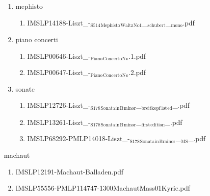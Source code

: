 \documentclass[11pt]{article}
\begin{document}
\begin{enumerate}
\item mephisto
\label{sec-1-1-1-1-44-42-7}
\begin{enumerate}
\item IMSLP14188-Liszt\_-$_{\text{S514}}$$_{\text{Mephisto}}$$_{\text{Waltz}}$$_{\text{No1}}$\_$_{\text{schubert}}$\_$_{\text{mono}}$.pdf
\label{sec-1-1-1-1-44-42-7-1}
\end{enumerate}

\item piano concerti
\label{sec-1-1-1-1-44-42-8}
\begin{enumerate}
\item IMSLP00646-Liszt\_-$_{\text{Piano}}$$_{\text{Concerto}}$$_{\text{No}}$.1.pdf
\label{sec-1-1-1-1-44-42-8-1}

\item IMSLP00647-Liszt\_-$_{\text{Piano}}$$_{\text{Concerto}}$$_{\text{No}}$.2.pdf
\label{sec-1-1-1-1-44-42-8-2}
\end{enumerate}

\item sonate
\label{sec-1-1-1-1-44-42-9}
\begin{enumerate}
\item IMSLP12726-Liszt\_-$_{\text{S178}}$$_{\text{Sonata}}$$_{\text{in}}$$_{\text{B}}$$_{\text{minor}}$\_$_{\text{breitkopf}}$$_{\text{1st}}$$_{\text{ed}}$\_.pdf
\label{sec-1-1-1-1-44-42-9-1}

\item IMSLP13261-Liszt\_-$_{\text{S178}}$$_{\text{Sonata}}$$_{\text{in}}$$_{\text{B}}$$_{\text{minor}}$\_$_{\text{first}}$$_{\text{edition}}$\_.pdf
\label{sec-1-1-1-1-44-42-9-2}

\item IMSLP68292-PMLP14018-Liszt\_-$_{\text{S178}}$$_{\text{Sonata}}$$_{\text{in}}$$_{\text{B}}$$_{\text{minor}}$\_$_{\text{MS}}$\_.pdf
\label{sec-1-1-1-1-44-42-9-3}
\end{enumerate}
\end{enumerate}

\item machaut
\label{sec-1-1-1-1-44-43}
\begin{enumerate}
\item IMSLP12191-Machaut-Balladen.pdf
\label{sec-1-1-1-1-44-43-1}

\item IMSLP55556-PMLP114747-1300MachautMass01Kyrie.pdf
\label{sec-1-1-1-1-44-43-2}
\end{enumerate}
\end{document}
